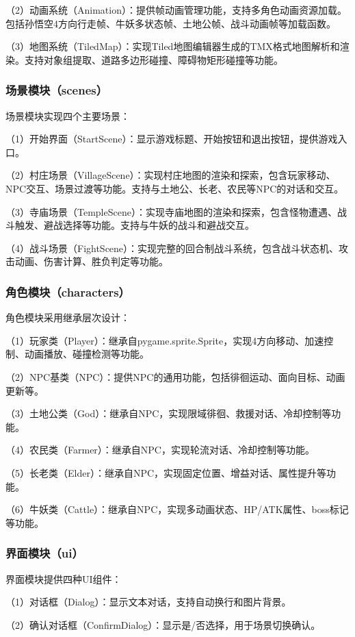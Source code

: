 \documentclass[a4paper,12pt]{article}
\begin{document}
（2）动画系统（Animation）：提供帧动画管理功能，支持多角色动画资源加载。包括孙悟空4方向行走帧、牛妖多状态帧、土地公帧、战斗动画帧等加载函数。

（3）地图系统（TiledMap）：实现Tiled地图编辑器生成的TMX格式地图解析和渲染。支持对象组提取、道路多边形碰撞、障碍物矩形碰撞等功能。

\subsubsection{场景模块（scenes）}
场景模块实现四个主要场景：

（1）开始界面（StartScene）：显示游戏标题、开始按钮和退出按钮，提供游戏入口。

（2）村庄场景（VillageScene）：实现村庄地图的渲染和探索，包含玩家移动、NPC交互、场景过渡等功能。支持与土地公、长老、农民等NPC的对话和交互。

（3）寺庙场景（TempleScene）：实现寺庙地图的渲染和探索，包含怪物遭遇、战斗触发、避战选择等功能。支持与牛妖的战斗和避战交互。

（4）战斗场景（FightScene）：实现完整的回合制战斗系统，包含战斗状态机、攻击动画、伤害计算、胜负判定等功能。

\subsubsection{角色模块（characters）}
角色模块采用继承层次设计：

（1）玩家类（Player）：继承自pygame.sprite.Sprite，实现4方向移动、加速控制、动画播放、碰撞检测等功能。

（2）NPC基类（NPC）：提供NPC的通用功能，包括徘徊运动、面向目标、动画更新等。

（3）土地公类（God）：继承自NPC，实现限域徘徊、救援对话、冷却控制等功能。

（4）农民类（Farmer）：继承自NPC，实现轮流对话、冷却控制等功能。

（5）长老类（Elder）：继承自NPC，实现固定位置、增益对话、属性提升等功能。

（6）牛妖类（Cattle）：继承自NPC，实现多动画状态、HP/ATK属性、boss标记等功能。

\subsubsection{界面模块（ui）}
界面模块提供四种UI组件：

（1）对话框（Dialog）：显示文本对话，支持自动换行和图片背景。

（2）确认对话框（ConfirmDialog）：显示是/否选择，用于场景切换确认。
\end{document}
